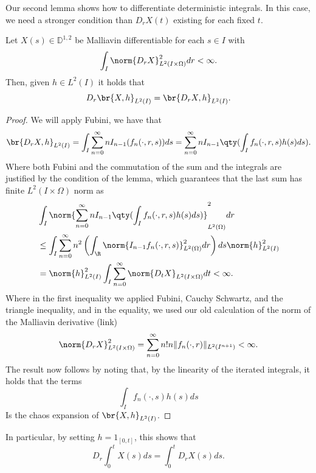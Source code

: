 \documentclass[
    a4paper,
    DIV=14,
    abstract=true,
    numbers=noenddot
]{scrartcl}
\begin{document}
Our second lemma shows how to differentiate deterministic integrals. In this case, we need a stronger condition than $D_rX(t)$ existing for each fixed $t$.
\begin{lemma}
	Let $X(s)\in \mathbb{D}^{1,2}$ be Malliavin differentiable for each $s\in I$ with
	\begin{equation*}
		\int_{I} \norm{D_rX}_{L^2(I\times\Omega)}^2dr<\infty.
		\end{equation*}
	Then, given $h\in L^2(I)$ it holds that
	\begin{equation*}
		D_r\br{X,h}_{L^2(I)}=\br{D_rX,h}_{L^2(I)}.
	\end{equation*}
\end{lemma}
\begin{proof}
	We will apply Fubini, we have that
	\begin{equation*}
		\br{D_rX,h}_{L^2(I)}=\int_I\sum_{n=0}^{\infty}nI_{n-1}(f_n(\cdot ,r,s))ds=\sum_{n=0}^{\infty}nI_{n-1}\qty(\int_If_n(\cdot ,r,s)h(s)ds).
	\end{equation*}
	Where both Fubini and the commutation of the sum and the integrals are justified by the condition of the lemma, which guarantees that the last sum has finite $L^2(I\times\Omega)$ norm as
	\begin{align*}
		&\int_{I} \norm{\sum_{n=0}^{\infty}nI_{n-1}\qty(\int_If_n(\cdot ,r,s)h(s)ds)}_{L^2(\Omega)}^2d r  \\
		&\leq \int_{I}\sum_{n=0}^{\infty}n^2 \left(\int_{\R}\norm{I_{n-1}f_n(\cdot ,r,s)}^2_{L^2(\Omega)}d r\right)ds \norm{h}^2_{L^2(I)}\\
		&=\norm{h}^2_{L^2(I)}\int_{I}\sum_{n=0}^{\infty}\norm{D_tX}_{L^2(I\times\Omega)}d t<\infty .
	\end{align*}
	Where in the first inequality we applied Fubini, Cauchy Schwartz, and the triangle inequality, and in the equality, we used our old calculation of the norm of the Malliavin derivative (link)
	\begin{equation*}
		\norm{D_rX}_{L^2(I\times\Omega)}^2=\sum_{n=0}^{\infty} n!n\|f_n(\cdot ,r )\|_{L^2(I^{n+1})}<\infty.
	\end{equation*}
	The result now follows by noting that, by the linearity of the iterated integrals, it holds that
	the terms
	\begin{equation*}
		\int_If_n(\cdot ,s)h(s)ds	\end{equation*}
	Is the chaos expansion of $\br{X,h}_{L^2(I)}$.
\end{proof}
In particular, by setting $h=1_{[0,t]}$, this shows that
\begin{equation*}
	D_r \int_{0}^t X(s)ds=\int_{0}^t D_rX(s) ds.
\end{equation*}
\end{document}
